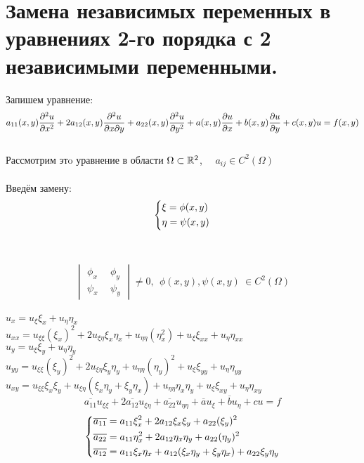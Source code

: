 \documentclass[../main.tex]{subfiles}
\begin{document}
\section{Замена независимых переменных в уравнениях 2-го порядка с 2 независимыми переменными.}
Запишем уравнение:
\begin{equation}\label{eq:1.6.1}
	a_{11}(x,y)\frac{\partial^2 u}{\partial x^2} + 2a_{12}(x,y)\frac{\partial^2u}{\partial x \partial y} + a_{22}(x,y)\frac{\partial^2 u}{\partial y^2} + a(x,y)\frac{\partial u}{\partial x} +b(x,y)\frac{\partial u}{\partial y}+c(x,y)u = f(x,y) \end{equation} \\
Рассмотрим этo уравнение в области $\Omega \subset \mathbb{R}^2$, \ \ $a_{ij} \in C^2(\Omega)$ \\
\\ Введём замену:
$$\begin{dcases}\xi = \phi(x,y) \\ \eta = \psi(x,y)\end{dcases}$$
\\ \\
$$\begin{vmatrix}
		\phi_x \  & \ \phi_y
		\\
		\psi_x \  & \ \psi_y
	\end{vmatrix} \ne 0, \ \ \phi(x,y), \psi(x,y) \ \in C^2(\Omega)
$$ \\
$
	u_x = u_\xi\xi_{x}+u_\eta\eta_x
$  \\$
u_{xx} = u_{\xi\xi}(\xi_x)^2 + 2u_{\xi\eta}\xi_x\eta_x+u_{\eta\eta}(\eta_x^2)+u_\xi\xi_{xx}+u_\eta\eta_{xx}
$\\ $
u_y=u_\xi\xi_y+u_\eta\eta_y
$\\
$u_{yy}=u_{\xi\xi}(\xi_y)^2+2u_{\xi\eta}\xi_y\eta_y+u_{\eta\eta}(\eta_y)^2+u_\xi\xi_{yy}+u_\eta\eta_{yy}$\\
$u_{xy}=u_{\xi\xi}\xi_{x}\xi_y+u_{\xi\eta}(\xi_x\eta_y+\xi_y\eta_x)+u_{\eta\eta}\eta_x\eta_y+u_\xi\xi_{xy}+u_\eta\eta_{xy}$ \\
	\begin{equation}
		\overline{a_{11}}u_{\xi\xi}+2\overline{a_{12}}u_{\xi\eta}+\overline{a_{22}}u_{\eta\eta}+\overline{a}u_{\xi}+\overline{b}u_\eta+cu=f
	\end{equation}
	\begin{equation}
		\begin{dcases}
			\overline{a_{11}}=a_{11}\xi_x^2+2a_{12}\xi_x\xi_y+a_{22}(\xi_y)^2
			\\
			\overline{a_{22}}=a_{11}\eta_x^2+2a_{12}\eta_x\eta_y+a_{22}(\eta_y)^2
			\\
			\overline{a_{12}}=a_{11}\xi_x\eta_x+a_{12}(\xi_x\eta_y+\xi_y\eta_x)+a_{22}\xi_y\eta_y
		\end{dcases}
	\end{equation}
\end{document}
